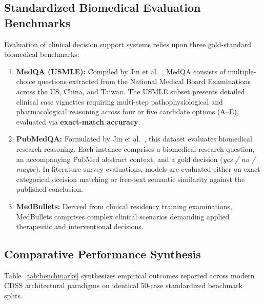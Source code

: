 \documentclass[conference]{IEEEtran}
\begin{document}
\subsection{Standardized Biomedical Evaluation Benchmarks}
Evaluation of clinical decision support systems relies upon three gold-standard biomedical benchmarks:
\begin{enumerate}
    \item \textbf{MedQA (USMLE):} Compiled by Jin et al.~\cite{jin2021disease}, MedQA consists of multiple-choice questions extracted from the National Medical Board Examinations across the US, China, and Taiwan. The USMLE subset presents detailed clinical case vignettes requiring multi-step pathophysiological and pharmacological reasoning across four or five candidate options (A--E), evaluated via \textbf{exact-match accuracy}.
    \item \textbf{PubMedQA:} Formulated by Jin et al.~\cite{jin2019pubmedqa}, this dataset evaluates biomedical research reasoning. Each instance comprises a biomedical research question, an accompanying PubMed abstract context, and a gold decision (\textit{yes / no / maybe}). In literature survey evaluations, models are evaluated either on exact categorical decision matching or free-text semantic similarity against the published conclusion.
    \item \textbf{MedBullets:} Derived from clinical residency training examinations, MedBullets comprises complex clinical scenarios demanding applied therapeutic and interventional decisions.
\end{enumerate}

\subsection{Comparative Performance Synthesis}
Table~\ref{tab:benchmarks} synthesizes empirical outcomes reported across modern CDSS architectural paradigms on identical 50-case standardized benchmark splits.
\end{document}
